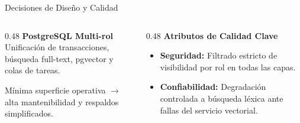 \documentclass[11pt,aspectratio=169]{beamer}
\begin{document}
\begin{frame}{Decisiones de Diseño y Calidad}
  \small
  \begin{columns}[T]
    \begin{column}{0.48\textwidth}
      {\headingfont\bfseries\color{brandlt}PostgreSQL Multi-rol}\\[0.15cm]
      Unificación de transacciones, búsqueda full-text, pgvector y colas de tareas.

      \vspace{0.2cm}
      Mínima superficie operativa $\rightarrow$ alta mantenibilidad y respaldos simplificados.
    \end{column}

    \begin{column}{0.48\textwidth}
      {\headingfont\bfseries\color{brandlt}Atributos de Calidad Clave}\\[0.15cm]
      \begin{itemize}
        \item \textbf{Seguridad:} Filtrado estricto de visibilidad por rol en todas las capas.
        \item \textbf{Confiabilidad:} Degradación controlada a búsqueda léxica ante fallas del servicio vectorial.
      \end{itemize}
    \end{column}
  \end{columns}
\end{frame}

\end{document}
